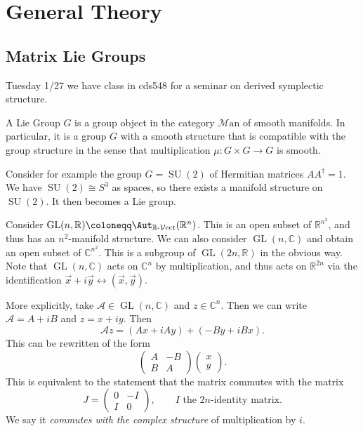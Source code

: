 \chapter{General Theory}

\section{Matrix Lie Groups}


Tuesday 1/27 we have class in cds548 for a seminar on derived symplectic structure.

\begin{definition}\label{1.1.1}
	A Lie Group $G$ is a group object in the category $\mathcal{M} \mathrm{an} $ of smooth manifolds. In particular, it is a group $G$ with a smooth structure that is compatible with the group structure in the sense that multiplication $\mu : G\times G \to G$ is smooth.
\end{definition}

Consider for example the group $G=\operatorname{SU} (2)$ of Hermitian matrices $A A^\dagger=1$. We have $\operatorname{SU} (2)\cong S^3$ as spaces, so there exists a manifold structure on $\operatorname{SU} (2)$. It then becomes a Lie group.

\begin{example}\label{1.1.2}
	Consider $\operatorname{GL} (n,\mathbb{R} )\coloneqq \Aut_{\mathbb{R} \text{-} \mathcal{V} \mathrm{ect} }(\mathbb{R} ^n) $. This is an open subset of $\mathbb{R} ^{n^2} $, and thus has an $n^2$-manifold structure. We can also consider $\operatorname{GL} (n,\mathbb{C} )$ and obtain an open subset of $\mathbb{C} ^{n^2} $. This is a subgroup of $\operatorname{GL} (2n,\mathbb{R} )$ in the obvious way. Note that $\operatorname{GL} (n,\mathbb{C} )$ acts on $\mathbb{C} ^n$ by multiplication, and thus acts on $\mathbb{R} ^{2n} $ via the identification $\vec{x}+i \vec{y} \leftrightarrow (\vec{x} , \vec{y} )$.

	More explicitly, take $\mathcal{A} \in \operatorname{GL} (n,\mathbb{C} )$ and $z\in\mathbb{C} ^n$. Then we can write $\mathcal{A} =A+iB$ and $z=x+iy$. Then
	\[
		\mathcal{A} z=\left( Ax+iAy \right) +(-By+iBx)
	.\]
	This can be rewritten of the form
	\[
		\begin{pmatrix}
		A & -B \\
		B & A
		\end{pmatrix}\begin{pmatrix}
		x \\
		y
		\end{pmatrix}
	.\]
	This is equivalent to the statement that the matrix commutes with the matrix
	\[
		J=\begin{pmatrix}
		0 & -I \\
		I & 0
		\end{pmatrix},\qquad I\text{ the $2n$-identity matrix}
	.\]
	We say it \emph{commutes with the complex structure} of multiplication by $i$.
\end{example}

